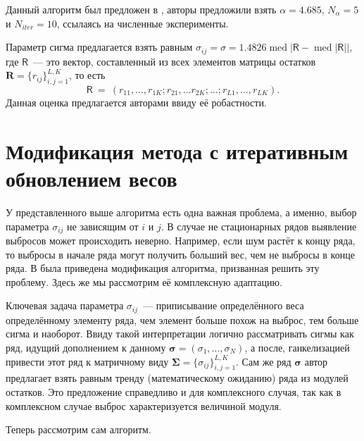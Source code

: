 \documentclass[specialist,
               substylefile = spbu.rtx,
               subf,href,colorlinks=true, 12pt]{disser}
\DeclareMathOperator{\med}{med}
\newcommand{\tX}[1]{\mathsf{#1}}
\begin{document}
Данный алгоритм был предложен в \cite{Chen}, авторы предложили взять $\alpha = 4.685$, $N_{\alpha} = 5$ и $N_{iter} = 10$, ссылаясь на численные эксперименты.

Параметр сигма предлагается взять равным $\sigma_{ij} = \sigma = 1.4826 \med {|\tX{R}-\med {|\tX{R}|}|}$, где $\tX{R}$~--- это вектор, составленный из всех элементов матрицы остатков $\mathbf{R} = \{r_{ij}\}_{i,j=1}^{L,K}$, то есть
\begin{equation*}
	\tX{R}~=~(r_{11},\ldots,r_{1K}; r_{21},\ldots r_{2K};\ldots;r_{L1},\ldots,r_{LK}).
\end{equation*} 
Данная оценка предлагается авторами ввиду её робастности.

\section{Модификация метода с итеративным обновлением весов}

У представленного выше алгоритма есть одна важная проблема, а именно, выбор параметра $\sigma_{ij}$ не зависящим от $i$ и $j$. В случае не стационарных рядов выявление выбросов может происходить неверно. Например, если шум растёт к концу ряда, то выбросы в начале ряда могут получить больший вес, чем не выбросы в конце ряда. В \cite{Tretyakova20} была приведена модификация алгоритма, призванная решить эту проблему. Здесь же мы рассмотрим её комплексную адаптацию.

Ключевая задача параметра $\sigma_{ij}$~--- приписывание определённого веса определённому элементу ряда, чем элемент больше похож на выброс, тем больше сигма и наоборот. Ввиду такой интерпретации логично рассматривать сигмы как ряд, идущий дополнением к данному $\bm{\sigma} = (\sigma_1,\ldots,\sigma_N)$, а после, ганкелизацией привести этот ряд к матричному виду $\mathbf{\Sigma}=\{\sigma_{ij}\}_{i,j=1}^{L,K}$. Сам же ряд $\bm{\sigma}$ автор \cite{Tretyakova20} предлагает взять равным тренду (математическому ожиданию) ряда из модулей остатков. Это предложение справедливо и для комплексного случая, так как в комплексном случае выброс характеризуется величиной модуля.

Теперь рассмотрим сам алгоритм.
\end{document}
